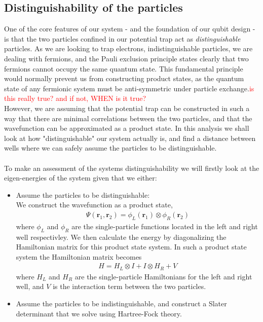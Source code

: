 \documentclass{subfiles}
\begin{document}
\subsection{Distinguishability of the particles}\label{sec:distinguishability}
One of the core features of our system - and the foundation of our qubit design - is that the two particles confined in our potential trap act as \emph{distinguishable} particles. As we are looking to trap electrons, indistinguishable particles, we are dealing with fermions, and the Pauli exclusion principle states clearly that two fermions cannot occupy the same quantum state. This fundamental principle would normally prevent us from constructing product states, as the quantum state of any fermionic system must be anti-symmetric under particle exchange.\textcolor{red}{is this really true? and if not, WHEN is it true?}
\\ However, we are assuming that the potential trap can be constructed in such a way that there are minimal correlations between the two particles, and that the wavefunction can be approximated as a product state. In this analysis we shall look at how "distinguishable" our system actually is, and find a distance between wells where we can safely assume the particles to be distinguishable. \\ \\
To make an assessment of the systems distinguishability we will firstly look at the eigen-energies of the system given that we either:
\begin{itemize}
    \item Assume the particles to be distinguishable: \\ We construct the wavefunction as a product state,
    \begin{align*}
        \Psi(\mathbf{r}_1, \mathbf{r}_2) = \phi_L(\mathbf{r}_1)\otimes\phi_R(\mathbf{r}_2)
    \end{align*} 
    where $\phi_L$ and $\phi_R$ are the single-particle functions located in the left and right well respectivley. We then calculate the energy by diagonalizing the Hamiltonian matrix for this product state system. In such a product state system the Hamiltonian matrix becomes
    \begin{align*}
        H = H_L \otimes I + I \otimes H_R + V
    \end{align*}
    where $H_L$ and $H_R$ are the single-particle Hamiltonians for the left and right well, and $V$ is the interaction term between the two particles.
    \item Assume the particles to be indistinguishable, and construct a Slater determinant that we solve using Hartree-Fock theory.
\end{itemize}
\end{document}
